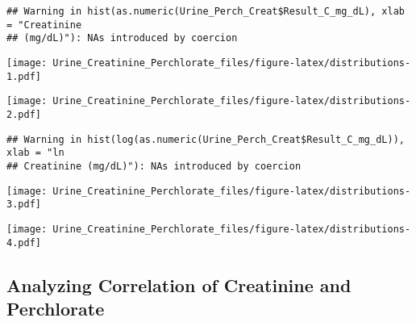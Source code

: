 \documentclass[]{article}
\newenvironment{Shaded}{\begin{snugshade}}{\end{snugshade}}
\newcommand{\DataTypeTok}[1]{\textcolor[rgb]{0.13,0.29,0.53}{#1}}
\newcommand{\KeywordTok}[1]{\textcolor[rgb]{0.13,0.29,0.53}{\textbf{#1}}}
\newcommand{\NormalTok}[1]{#1}
\newcommand{\OperatorTok}[1]{\textcolor[rgb]{0.81,0.36,0.00}{\textbf{#1}}}
\newcommand{\StringTok}[1]{\textcolor[rgb]{0.31,0.60,0.02}{#1}}
\begin{document}
\begin{verbatim}
## Warning in hist(as.numeric(Urine_Perch_Creat$Result_C_mg_dL), xlab = "Creatinine
## (mg/dL)"): NAs introduced by coercion
\end{verbatim}

\texttt{[image: Urine\_Creatinine\_Perchlorate\_files/figure-latex/distributions-1.pdf]}

\begin{Shaded}
\end{Shaded}

\texttt{[image: Urine\_Creatinine\_Perchlorate\_files/figure-latex/distributions-2.pdf]}

\begin{Shaded}
\end{Shaded}

\begin{verbatim}
## Warning in hist(log(as.numeric(Urine_Perch_Creat$Result_C_mg_dL)), xlab = "ln
## Creatinine (mg/dL)"): NAs introduced by coercion
\end{verbatim}

\texttt{[image: Urine\_Creatinine\_Perchlorate\_files/figure-latex/distributions-3.pdf]}

\begin{Shaded}
\end{Shaded}

\texttt{[image: Urine\_Creatinine\_Perchlorate\_files/figure-latex/distributions-4.pdf]}

\hypertarget{analyzing-correlation-of-creatinine-and-perchlorate}{%
\subsection{Analyzing Correlation of Creatinine and
Perchlorate}\label{analyzing-correlation-of-creatinine-and-perchlorate}}
\end{document}
